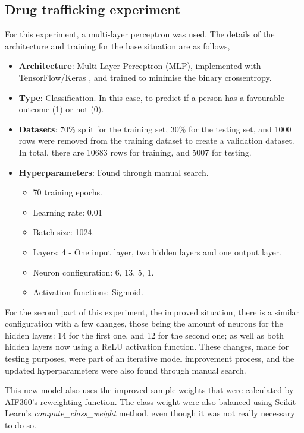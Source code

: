 \documentclass[fleqn,10pt]{wlscirep}
\begin{document}
\subsection{Drug trafficking experiment}

For this experiment, a multi-layer perceptron was used. The details of the architecture and training for the base situation are as follows,

\begin{itemize}
        \item \textbf{Architecture}: Multi-Layer Perceptron (MLP), implemented with TensorFlow/Keras \cite{tensorflow2015-whitepaper,chollet2015keras}, and trained to minimise the binary crossentropy.
        \item \textbf{Type}: Classification. In this case, to predict if a person has a favourable outcome (1) or not (0).
        \item \textbf{Datasets}: 70\% split for the training set, 30\% for the testing set, and 1000 rows were removed from the training dataset to create a validation dataset. In total, there are 10683 rows for training, and 5007 for testing.
        \item \textbf{Hyperparameters}: Found through manual search.
            \begin{itemize}
                \item 70 training epochs.
                \item Learning rate: 0.01
                \item Batch size: 1024.
                \item Layers: 4 - One input layer, two hidden layers and one output layer.
                \item Neuron configuration: 6, 13, 5, 1.
                \item Activation functions: Sigmoid.
            \end{itemize}
\end{itemize}

For the second part of this experiment, the improved situation, there is a similar configuration with a few changes, those being the amount of neurons for the hidden layers: 14 for the first one, and 12 for the second one; as well as both hidden layers now using a ReLU activation function. These changes, made for testing purposes, were part of an iterative model improvement process, and the updated hyperparameters were also found through manual search.

This new model also uses the improved sample weights that were calculated by AIF360's reweighting function. The class weight were also balanced using Scikit-Learn's \textit{compute\_class\_weight} method, even though it was not really necessary to do so.
\end{document}
